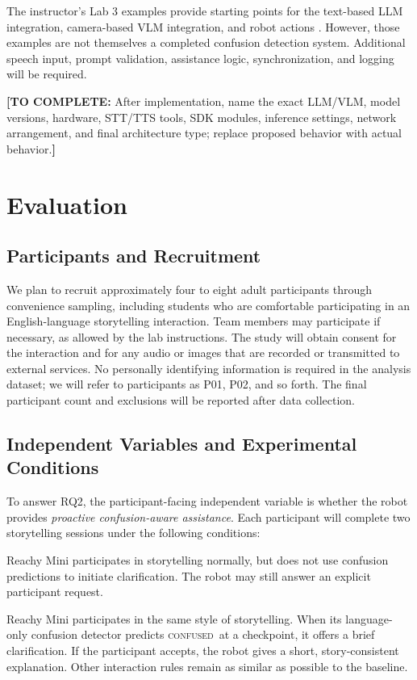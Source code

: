 \documentclass[conference]{IEEEtran}
\newcommand{\drafttodo}[1]{\par\smallskip\noindent\textcolor{red!65!black}{\textbf{[TO COMPLETE:} #1\textbf{]}}\par\smallskip}
\newcommand{\confused}{\textsc{confused}}
\begin{document}
The instructor's Lab 3 examples provide starting points for the text-based LLM integration, camera-based VLM integration, and robot actions \cite{coursecode2026}. However, those examples are not themselves a completed confusion detection system. Additional speech input, prompt validation, assistance logic, synchronization, and logging will be required.

\drafttodo{After implementation, name the exact LLM/VLM, model versions, hardware, STT/TTS tools, SDK modules, inference settings, network arrangement, and final architecture type; replace proposed behavior with actual behavior.}

\section{Evaluation}
\subsection{Participants and Recruitment}
We plan to recruit approximately four to eight adult participants through convenience sampling, including students who are comfortable participating in an English-language storytelling interaction. Team members may participate if necessary, as allowed by the lab instructions. The study will obtain consent for the interaction and for any audio or images that are recorded or transmitted to external services. No personally identifying information is required in the analysis dataset; we will refer to participants as P01, P02, and so forth. The final participant count and exclusions will be reported after data collection.

\subsection{Independent Variables and Experimental Conditions}
To answer RQ2, the participant-facing independent variable is whether the robot provides \emph{proactive confusion-aware assistance}. Each participant will complete two storytelling sessions under the following conditions:
\begin{description}[style=nextline]
\item[Condition A: Baseline / no proactive assistance.] Reachy Mini participates in storytelling normally, but does not use confusion predictions to initiate clarification. The robot may still answer an explicit participant request.
\item[Condition B: LLM-based proactive assistance.] Reachy Mini participates in the same style of storytelling. When its language-only confusion detector predicts \confused\ at a checkpoint, it offers a brief clarification. If the participant accepts, the robot gives a short, story-consistent explanation. Other interaction rules remain as similar as possible to the baseline.
\end{description}
\end{document}
